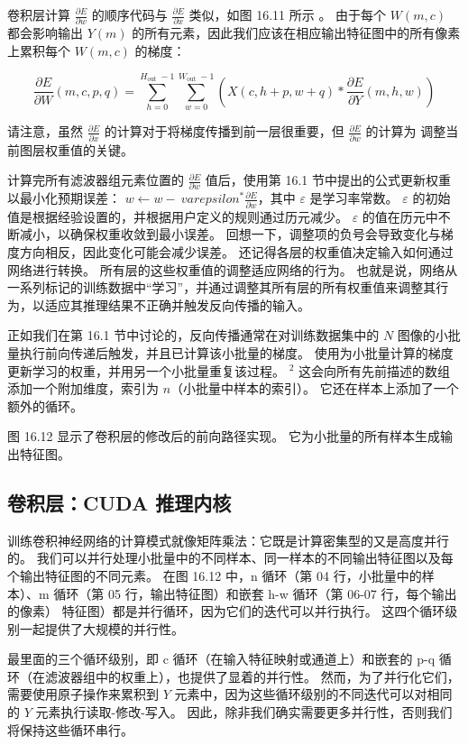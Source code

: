 卷积层计算 $\frac{\partial E}{\partial w}$ 的顺序代码与 $\frac{\partial E}{\partial x}$ 类似，如图 16.11 所示 。 由于每个 $W(m, c)$ 都会影响输出 $Y(m)$ 的所有元素，因此我们应该在相应输出特征图中的所有像素上累积每个 $W(m, c)$ 的梯度：

$$
\frac{\partial E}{\partial W}(m, c, p, q)=\sum_{h=0}^{H_{\text {out }}-1} \sum_{w=0}^ {W_{\text {out }}-1}\left(X(c, h+p, w+q) * \frac{\partial E}{\partial Y}(m, h, w)\right)
$$

请注意，虽然 $\frac{\partial E}{\partial x}$ 的计算对于将梯度传播到前一层很重要，但 $\frac{\partial E}{\partial w}$ 的计算为 调整当前图层权重值的关键。

计算完所有滤波器组元素位置的 $\frac{\partial E}{\partial w}$ 值后，使用第 16.1 节中提出的公式更新权重以最小化预期误差： $w \leftarrow w-\ varepsilon^{*} \frac{\partial E}{\partial w}$，其中 $\varepsilon$ 是学习率常数。 $\varepsilon$ 的初始值是根据经验设置的，并根据用户定义的规则通过历元减少。 $\varepsilon$ 的值在历元中不断减小，以确保权重收敛到最小误差。 回想一下，调整项的负号会导致变化与梯度方向相反，因此变化可能会减少误差。 还记得各层的权重值决定输入如何通过网络进行转换。 所有层的这些权重值的调整适应网络的行为。 也就是说，网络从一系列标记的训练数据中“学习”，并通过调整其所有层的所有权重值来调整其行为，以适应其推理结果不正确并触发反向传播的输入。

正如我们在第 16.1 节中讨论的，反向传播通常在对训练数据集中的 $N$ 图像的小批量执行前向传递后触发，并且已计算该小批量的梯度。 使用为小批量计算的梯度更新学习的权重，并用另一个小批量重复该过程。 ${ }^{2}$ 这会向所有先前描述的数组添加一个附加维度，索引为 $n$（小批量中样本的索引）。 它还在样本上添加了一个额外的循环。

图 16.12 显示了卷积层的修改后的前向路径实现。 它为小批量的所有样本生成输出特征图。

\subsection{卷积层：CUDA 推理内核}
训练卷积神经网络的计算模式就像矩阵乘法：它既是计算密集型的又是高度并行的。 我们可以并行处理小批量中的不同样本、同一样本的不同输出特征图以及每个输出特征图的不同元素。 在图 16.12 中，n 循环（第 04 行，小批量中的样本）、m 循环（第 05 行，输出特征图）和嵌套 h-w 循环（第 06-07 行，每个输出的像素） 特征图）都是并行循环，因为它们的迭代可以并行执行。 这四个循环级别一起提供了大规模的并行性。

最里面的三个循环级别，即 c 循环（在输入特征映射或通道上）和嵌套的 p-q 循环（在滤波器组中的权重上），也提供了显着的并行性。 然而，为了并行化它们，需要使用原子操作来累积到 $Y$ 元素中，因为这些循环级别的不同迭代可以对相同的 $Y$ 元素执行读取-修改-写入。 因此，除非我们确实需要更多并行性，否则我们将保持这些循环串行。

